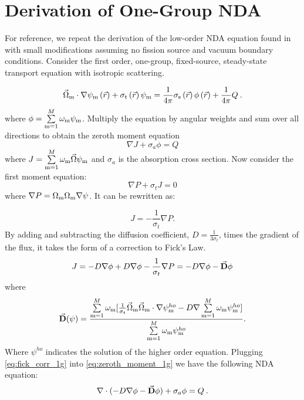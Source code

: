 \section{Derivation of One-Group NDA}
For reference, we repeat the derivation of the low-order NDA equation found in \cite{morel-holo} with small modifications assuming no fission source and vacuum boundary conditions. Consider the first order, one-group, fixed-source, steady-state \sn transport equation with isotropic scattering. 

  \begin{equation}
  \vec{\Omega}_{\mathrm{m}}\cdot \nabla \psi_{\mathrm{m}} \left(\vec{r}\right)+ \sigma_{\mathrm{t}}\left(\vec{r}\right)\psi_{\mathrm{m}} = \frac{1}{4 \pi} \sigma_{\mathrm{s}}\left(\vec{r}\right) \phi\left(\vec{r}\right) + \frac{1}{4 \pi} Q\:.
  \end{equation}
where $\phi = \sum\limits_{\mathrm{m}=1}^M \omega_{\mathrm{m}} \psi_{\mathrm{m}}$. Multiply the equation by angular weights and sum over all directions to obtain the zeroth moment equation
\begin{equation}
  \nabla J + \sigma_a\phi  =  Q
  \label{eq:zeroth_moment_1g}
  \end{equation}
where $J = \sum\limits_{\mathrm{m}=1}^{M}\omega_{\mathrm{m}} \vec{\Omega}\psi_{\mathrm{m}}$ and $\sigma_a$ is the absorption cross section.   Now consider the first moment equation:
  \begin{equation}
  \nabla P + \sigma_t J = 0
  \end{equation}
where $\nabla P =  \Omega_{\mathrm{m}} \Omega_{\mathrm{m}} \nabla \psi$. It can be rewritten as: 

  \begin{equation}
  J= -\frac{1}{\sigma_t} \nabla P. 
  \end{equation}
  By adding and subtracting the diffusion coefficient, $D = \frac{1}{3\sigma_t}$, times the gradient of the flux, it takes the form of a correction to Fick's Law. 
  \begin{equation}
  J = -D \nabla \phi + D \nabla \phi - \frac{1}{\sigma_t} \nabla P \\
  = -D \nabla \phi - \vec{\textbf{D}} \phi
  \label{eq:fick_corr_1g}
  \end{equation}
  where 
 \begin{equation}
  \vec{\textbf{D}} (\psi) = \frac{\sum\limits_{\mathrm{m}=1}^M \omega_{\mathrm{m}} [\frac{1}{\sigma_t} \vec{\Omega}_{\mathrm{m}} \vec{\Omega}_{\mathrm{m}} \cdot \nabla\psi^{ho}_{\mathrm{m}} - D \nabla \sum\limits_{\mathrm{m}=1}^M \omega_{\mathrm{m}}\psi^{ho}_{\mathrm{m}}]}{\sum\limits_{\mathrm{m}=1}^M \omega_{\mathrm{m}} \psi^{ho}_{\mathrm{m}}}.
  \end{equation} 
Where $\psi^{ho}$ indicates the solution of the higher order equation. Plugging \ref{eq:fick_corr_1g} into \ref{eq:zeroth_moment_1g} we have the following NDA equation:
  \begin{equation}
  \nabla\cdot(-D \nabla \phi - \vec{\bf D} \phi) + \sigma_a \phi = Q \:. \label{eq:NDA_1g}
  \end{equation}

